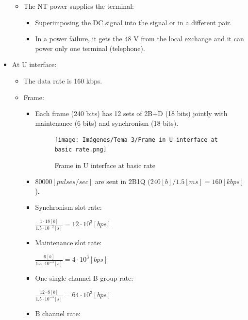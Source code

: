 \documentclass[
	12pt,
	twoside
]{book}
\begin{document}
\begin{itemize}
{\begin{itemize}
{\begin{itemize}
{						\begin{figure}[H]
							\centering
							\texttt{[image: Imágenes/Tema 3/Line coding in interface S at basic rate.png]}
							\caption{
								\label{fig:unit3_coding_S_basic}
								Line coding in interface S at basic rate (1s signs' alternation)
							}
						\end{figure}
					}
					\item {
						The NT power supplies the terminal:
						\begin{itemize}
							\item Superimposing the DC signal into the signal or in a different pair.
							\item In a power failure, it gets the 48 V from the local exchange and it can power only one terminal (telephone).
						\end{itemize}
					}
				\end{itemize}
			}
		\end{itemize}
	}
	\item {
		At U interface:
		\begin{itemize}
			\item The data rate is 160 kbps.
			\item {
				Frame:
				\begin{itemize}
					\item {
						Each frame (240 bits) has 12 sets of 2B+D (18 bits) jointly with maintenance (6 bits) and synchronism (18 bits).

						\begin{figure}[H]
							\centering
							\texttt{[image: Imágenes/Tema 3/Frame in U interface at basic rate.png]}
							\caption{
								\label{fig:unit3_frame_U_basic}
								Frame in U interface at basic rate
							}
						\end{figure}
					}
					\item $80000 [pulses/sec]$ are sent in 2B1Q ($240[b]/1.5[ms] = 160 [kbps]$).
					\item {
						Synchronism slot rate:

						$
							\frac {1 \cdot 18 [b]} {1.5 \cdot 10^{-3} [s]} = 12 \cdot 10^3 [bps]
						$
					}
					\item {
						Maintenance slot rate:

						$
							\frac {6 [b]} {1.5 \cdot 10^{-3} [s]} = 4 \cdot 10^3 [bps]
						$
					}
					\item {
						One single channel B group rate:

						$
							\frac {12 \cdot 8 [b]} {1.5 \cdot 10^{-3} [s]} = 64 \cdot 10^3 [bps]
						$
					}
					\item {
						B channel rate:

}
\end{itemize}}
\end{itemize}}
\end{itemize}
\end{document}
